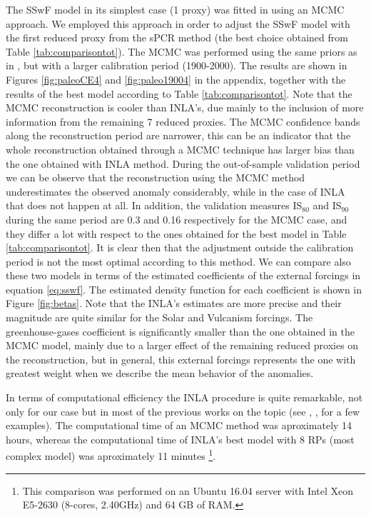 \documentclass[11pt]{amsart}
\theoremstyle{plain}
\theoremstyle{definition}
\theoremstyle{remark}
\begin{document}
The SSwF model in its simplest case (1 proxy) was fitted in \cite{Barboza2014}
using an MCMC approach. We employed this approach in order to adjust the
SSwF model with the first reduced proxy from the sPCR method (the best choice
obtained from Table \ref{tab:comparisontot}). The MCMC was performed using the
same priors as in \cite{Barboza2014}, but with a larger calibration period
(1900-2000). The results are shown in Figures \ref{fig:paleoCE4} and
\ref{fig:paleo19004} in the appendix, together with the results of the best
model according to Table \ref{tab:comparisontot}. Note that the MCMC reconstruction is cooler than INLA's, due
mainly to the inclusion of more information from the remaining 7 reduced
proxies. The MCMC confidence bands along the reconstruction period are narrower,
this can be an indicator that the whole reconstruction obtained through a MCMC technique has larger
bias than the one obtained with INLA method. During the out-of-sample validation
period we can be observe that the reconstruction using the MCMC method
underestimates the observed anomaly considerably, while in the case of INLA that
does not happen at all. In addition, the validation measures IS$_{80}$ and IS$_{90}$
during the same period are 0.3 and 0.16 respectively for the MCMC case, and they
differ a lot with respect to the ones obtained for the best model in Table
\ref{tab:comparisontot}. It is clear then that the adjustment outside the
calibration period is not the most optimal according to this method. We can
compare also these two models in terms of the estimated coefficients of the
external forcings in equation \eqref{eq:sswf}. The estimated density function
for each coefficient is shown in Figure \ref{fig:betas}. Note that the INLA's
estimates are more precise and their magnitude are quite similar for the Solar and Vulcanism
forcings. The greenhouse-gases coefficient is significantly smaller than the one
obtained in the MCMC model, mainly due to a larger effect of the remaining
reduced proxies on the reconstruction, but in general, this external forcings
represents the one with greatest weight when we describe the mean behavior of the anomalies.

In terms of computational efficiency the INLA procedure is quite remarkable, not only
for our case but in most of the previous works on the topic (see \cite{Rue2009},
\cite{Blangiardo2013}, \cite{Ruiz-Cardenas2012} for a few examples). The
computational time of an MCMC method was
aproximately 14 hours, whereas the computational time of INLA's best model with
8 RPs (most complex model) was aproximately 11 minutes \footnote{This comparison
was performed on an Ubuntu 16.04 server with Intel Xeon E5-2630 (8-cores,
2.40GHz) and 64 GB of RAM.}. 
\end{document}
